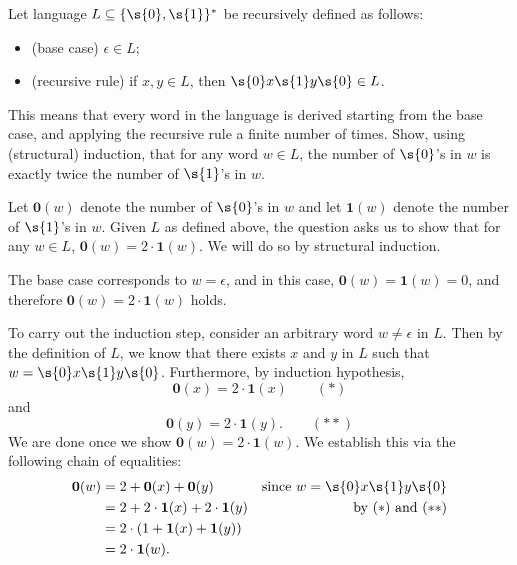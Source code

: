 \begin{flex}
\begin{exercise} \label{exercise:Structural-induction-on-words}
Let language $L \subseteq \{\s{0},\s{1}\}^*$ be recursively defined as follows:
\begin{itemize}
    \item (base case) $\epsilon \in L$;
    \item (recursive rule) if $x, y \in L$, then $\s{0}x\s{1}y\s{0} \in L$.
\end{itemize}
This means that every word in the language is derived starting from the base case, and applying the recursive rule a finite number of times. 
Show, using (structural) induction, that for any word $w \in L$, the number of $\s{0}$'s in $w$ is exactly twice the number of $\s{1}$'s in $w$.
\end{exercise}

\begin{solution}
Let $\mathbf{0}(w)$ denote the number of $\s{0}$'s in $w$ and let $\mathbf{1}(w)$ denote the number of $\s{1}$'s in $w$. Given $L$ as defined above, the question asks us to show that for any $w \in L$, $\mathbf{0}(w) = 2 \cdot \mathbf{1}(w)$. We will do so by structural induction.

The base case corresponds to $w = \epsilon$, and in this case, $\mathbf{0}(w) = \mathbf{1}(w) = 0$, and therefore $\mathbf{0}(w) = 2 \cdot \mathbf{1}(w)$ holds.

To carry out the induction step, consider an arbitrary word $w \neq \epsilon$ in $L$. Then by the definition of $L$, we know that there exists $x$ and $y$ in $L$ such that $w = \s{0}x\s{1}y\s{0}$. Furthermore, by induction hypothesis, 
\begin{equation*} %
    \mathbf{0}(x) = 2 \cdot \mathbf{1}(x) \quad \quad (*)
\end{equation*}
and 
\begin{equation*} %
    \mathbf{0}(y) = 2 \cdot \mathbf{1}(y). \quad \quad (**)
\end{equation*}
We are done once we show $\mathbf{0}(w) = 2 \cdot \mathbf{1}(w)$. We establish this via the following chain of equalities: 
\begin{align*}
    \mathbf{0}(w) & = 2 + \mathbf{0}(x) + \mathbf{0}(y) & \text{since $w = \s{0}x\s{1}y\s{0}$} \\
    & = 2 + 2 \cdot \mathbf{1}(x) + 2 \cdot \mathbf{1}(y) & \text{by $(*)$ and $(**)$}\\
    & = 2 \cdot (1 + \mathbf{1}(x) + \mathbf{1}(y)) \\
    & = 2 \cdot \mathbf{1}(w).
\end{align*}

\end{solution}
\end{flex}


